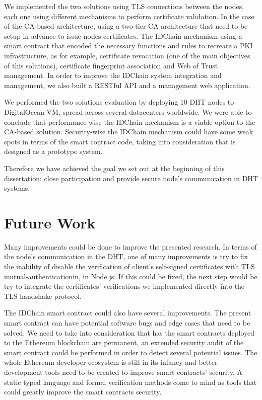 We implemented the two solutions using TLS connections between the nodes, each one using different mechanisms to perform certificate validation.
In the case of the CA-based architecture, using a two-tier CA architecture that need to be setup in advance to issue nodes certificates.
The IDChain mechanism using a smart contract that encoded the necessary functions and rules to recreate a \ac{PKI} infrastructure, as for example, certificate revocation (one of the main objectives of this solutions), certificate fingerprint association and Web of Trust management.
In order to improve the IDChain system integration and management, we also built a RESTful API and a management web application.

We performed the two solutions evaluation by deploying 10 DHT nodes to DigitalOcean \ac{VM}, spread across several datacenters worldwide.
We were able to conclude that performance-wise the IDChain mechanism is a viable option to the CA-based solution.
Security-wise the IDChain mechanism could have some weak spots in terms of the smart contract code, taking into consideration that is designed as a prototype system.

Therefore we have achieved the goal we set out at the beginning of this dissertation: close participation and provide secure node's communication in DHT systems.

\section{Future Work}
\label{section:future}

Many improvements could be done to improve the presented research.
In terms of the node's communication in the DHT, one of many improvements is try to fix the inability of disable the verification of client's self-signed certificates with TLS mutual-authenticationin, in Node.js.
If this could be fixed, the next step would be try to integrate the certificates' verifications we implemented directly into the TLS handshake protocol.

The IDChain smart contract could also have several improvements.
The present smart contract can have potential software bugs and edge cases that need to be solved.
We need to take into consideration that has the smart contracts deployed to the Ethereum blockchain are permanent, an extended security audit of the smart contract could be performed in order to detect several potential issues.
The whole Ethereum developer ecosystem is still in its infancy and better development tools need to be created to improve smart contracts' security.
A static typed language and formal verification methods come to mind as tools that could greatly improve the smart contracts security.


